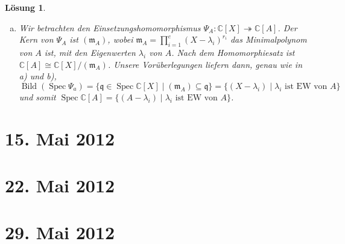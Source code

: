 \documentclass[a4paper,12pt]{report}
\theoremstyle{break}
\newtheorem{Loes}{L\"osung}
\theoremstyle{nonumberbreak}
\theoremstyle{nonumberplain}
\DeclareMathOperator{\Quot}{Quot}
\DeclareMathOperator{\Spec}{Spec}
\DeclareMathOperator{\Bild}{Bild}
\newcommand{\C}{\mathbb{C}}
\newcommand{\calO}{\mathcal{O}}
\begin{document}
\begin{Loes}
\begin{enumerate}[a)]
 \begin{center}
\end{center}
 
 
 \item Wir betrachten den Einsetzungshomomorphismus $\Psi_A: \C[X] \twoheadrightarrow \C[A]$. Der Kern von $\Psi_A$ ist $(\mathfrak{m}_A)$, wobei $\mathfrak{m}_A = \prod_{i=1}^e (X-\lambda_i)^{r_i}$ das Minimalpolynom von $A$ ist, mit den Eigenwerten $\lambda_i$ von $A$. Nach dem Homomorphiesatz ist $\C[A] \cong \C[X]/(\mathfrak{m}_A)$. Unsere  Vorüberlegungen liefern dann, genau wie in a) und b), 
 $$\Bild(\Spec \Psi_a) = \{ \mathfrak{q} \in \Spec \C[X] \mid (\mathfrak{m}_A) \subseteq \mathfrak{q} \} = \{(X- \lambda_i) \mid \lambda_i \textrm{ ist EW von } A \}$$
 und somit $\Spec \C[A] = \{(A- \lambda_i) \mid \lambda_i \textrm{ ist EW von } A\}$.
\end{enumerate}

\end{Loes}

\newpage
\section{15. Mai 2012}
\setcounter{Aufg}{0}
\setcounter{Loes}{0}

\newpage
\section{22. Mai 2012}
\setcounter{Aufg}{0}
\setcounter{Loes}{0}

\newpage
\section{29. Mai 2012}
\setcounter{Aufg}{0}
\setcounter{Loes}{0}
\end{document}
